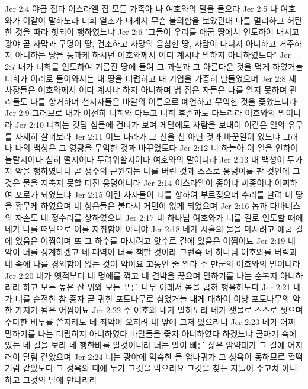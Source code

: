 Jer 2:4  야곱 집과 이스라엘 집 모든 가족아 나 여호와의 말을 들으라
Jer 2:5  나 여호와가 이같이 말하노라 너희 열조가 내게서 무슨 불의함을 보았관대 나를 멀리하고 허탄한 것을 따라 헛되이 행하였느냐
Jer 2:6  "그들이 우리를 애굽 땅에서 인도하여 내시고 광야 곧 사막과 구덩이 땅, 건조하고 사망의 음침한 땅, 사람이 다니지 아니하고 거주하지 아니하는 땅을 통과케 하시던 여호와께서 어디 계시냐 말하지 아니하였도다"
Jer 2:7  내가 너희를 인도하여 기름진 땅에 들여 그 과실과 그 아름다운 것을 먹게 하였거늘 너희가 이리로 들어와서는 내 땅을 더럽히고 내 기업을 가증히 만들었으며
Jer 2:8  제사장들은 여호와께서 어디 계시냐 하지 아니하며 법 잡은 자들은 나를 알지 못하며 관리들도 나를 항거하며 선지자들은 바알의 이름으로 예언하고 무익한 것을 좇았느니라
Jer 2:9  그러므로 내가 여전히 너희와 다투고 너희 후손과도 다투리라 여호와의 말이니라
Jer 2:10  너희는 깃딤 섬들에 건너가 보며 게달에도 사람을 보내어 이같은 일의 유무를 자세히 살펴보라
Jer 2:11  어느 나라가 그 신을 신 아닌 것과 바꾼일이 있느냐 그러나 나의 백성은 그 영광을 무익한 것과 바꾸었도다
Jer 2:12  너 하늘아 이 일을 인하여 놀랄지어다 심히 떨지어다 두려워할지어다 여호와의 말이니라
Jer 2:13  내 백성이 두가지 악을 행하였나니 곧 생수의 근원되는 나를 버린 것과 스스로 웅덩이를 판 것인데 그것은 물을 저축지 못할 터진 웅덩이니라
Jer 2:14  이스라엘이 종이냐 씨종이냐 어찌하여 포로가 되었느냐
Jer 2:15  어린 사자들이 너를 향하여 부르짖으며 수리를 날려 네 땅을 황무케 하였으며 네 성읍들은 불타서 거민이 없게 되었으며
Jer 2:16  놉과 다바네스의 자손도 네 정수리를 상하였으니
Jer 2:17  네 하나님 여호와가 너를 길로 인도할 때에 네가 나를 떠남으로 이를 자취함이 아니야
Jer 2:18  네가 시홀의 물을 마시려고 애굽 길에 있음은 어찜이며 또 그 하수를 마시려고 앗수르 길에 있음은 어찜이뇨
Jer 2:19  네 악이 너를 징계하겠고 네 패역이 너를 책할 것이라 그런즉 네 하나님 여호와를 버림과 네 속에 나를 경외함이 없는 것이 악이요 고통인 줄 알라 주 만군의 여호와의 말이니라
Jer 2:20  네가 옛적부터 네 멍에를 꺾고 네 결박을 끊으며 말하기를 나는 순복지 아니하리라 하고 모든 높은 산 위와 모든 푸른 나무 아래서 몸을 굽혀 행음하도다
Jer 2:21  내가 너를 순전한 참 종자 곧 귀한 포도나무로 심었거늘 내게 대하여 이방 포도나무의 악한 가지가 됨은 어찜이뇨
Jer 2:22  주 여호와 내가 말하노라 네가 잿물로 스스로 씻으며 수다한 비누를 쓸지라도 네 죄악이 오히려 내 앞에 그저 있으리니
Jer 2:23  네가 어찌 말하기를 나는 더럽히지 아니하였다 바알들을 좇지 아니하였다 하겠느냐 골짜기 속에 있는 네 길을 보라 네 행한바를 알것이니라 너는 발이 빠른 젊은 암약대가 그 길에 어지러이 달림 같았으며
Jer 2:24  너는 광야에 익숙한 들 암나귀가 그 성욕이 동하므로 헐떡거림 같았도다 그 성욕의 때에 누가 그것을 막으리요 그것을 찾는 자들이 수고치 아니하고 그것의 달에 만나리라
